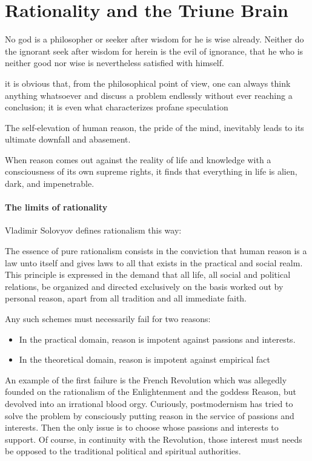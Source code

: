 \section{Rationality and the Triune Brain}

\begin{quotex}
No god is a philosopher or seeker after wisdom for he is wise already. Neither do the ignorant seek after wisdom for herein is the evil of ignorance, that he who is neither good nor wise is nevertheless satisfied with himself. 

it is obvious that, from the philosophical point of view, one can always think anything whatsoever and discuss a problem endlessly without ever reaching a conclusion; it is even what characterizes profane speculation 

The self-elevation of human reason, the pride of the mind, inevitably leads to its ultimate downfall and abasement. 

When reason comes out against the reality of life and knowledge with a consciousness of its own supreme rights, it finds that everything in life is alien, dark, and impenetrable. 

\end{quotex}
\paragraph{The limits of rationality}
Vladimir Solovyov defines rationalism this way:

\begin{quotex}
The essence of pure rationalism consists in the conviction that human reason is a law unto itself and gives laws to all that exists in the practical and social realm. This principle is expressed in the demand that all life, all social and political relations, be organized and directed exclusively on the basis worked out by personal reason, apart from all tradition and all immediate faith. 

\end{quotex}
Any such schemes must necessarily fail for two reasons:

\begin{itemize}
\item In the practical domain, reason is impotent against passions and interests. 
\item In the theoretical domain, reason is impotent against empirical fact 
\end{itemize}
An example of the first failure is the French Revolution which was allegedly founded on the rationalism of the Enlightenment and the goddess Reason, but devolved into an irrational blood orgy. Curiously, postmodernism has tried to solve the problem by consciously putting reason in the service of passions and interests. Then the only issue is to choose whose passions and interests to support. Of course, in continuity with the Revolution, those interest must needs be opposed to the traditional political and spiritual authorities.

